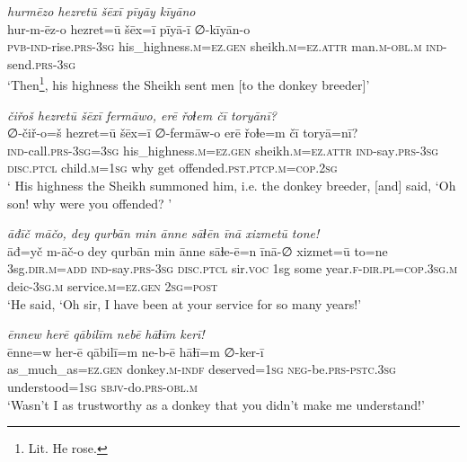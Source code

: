 \ea \label{HB.78}
\textit{hurmēzo hezretū šēxī pīyāy kīyāno} \\ 
\gll hur-m-ēz-o hezret=ū šēx=ī pīyā-ī ∅-kīyān-o \\ 
 \textsc{pvb-}\textsc{ind-}rise\textsc{.prs}\textsc{-3sg} his\_highness\textsc{.m}\textsc{=ez}\textsc{.gen} sheikh\textsc{.m}\textsc{=ez}.\textsc{attr} man\textsc{.m}\textsc{-obl}\textsc{.m} \textsc{ind-}send\textsc{.prs}\textsc{-3sg} \\ 
\glt `Then\footnote{Lit. He rose.}, his highness the Sheikh sent men [to the donkey breeder]'
\z 
 
\ea \label{HB.80}
\textit{čiřoš hezretū šēxī fermāwo, erē řoɫem čī toryānī?} \\ 
\gll ∅-čiř-o=š hezret=ū šēx=ī ∅-fermāw-o erē řoɫe=m čī toryā=nī? \\ 
 \textsc{ind-}call\textsc{.prs}\textsc{-3sg}\textsc{=3sg} his\_highness\textsc{.m}\textsc{=ez}\textsc{.gen} sheikh\textsc{.m}\textsc{=ez}.\textsc{attr} \textsc{ind-}say\textsc{.prs}\textsc{-3sg} \textsc{disc.ptcl} child\textsc{.m}\textsc{=1sg} why get offended\textsc{.pst}\textsc{.ptcp}\textsc{.m}\textsc{=cop}\textsc{.\textsc{2sg}} \\ 
\glt ` His highness the Sheikh summoned him, i.e. the donkey breeder, [and] said, ‘Oh son! why were you offended? '
\z 
 
\ea \label{HB.82}
\textit{āđīč māčo, dey qurbān min ānne sāɫēn īnā xizmetū tone!} \\ 
\gll āđ=yč m-āč-o dey qurbān min ānne sāɫe-ē=n īnā-∅ xizmet=ū to=ne \\ 
 3sg\textsc{.dir}\textsc{.m}\textsc{=add} \textsc{ind-}say\textsc{.prs}\textsc{-3sg} \textsc{disc.ptcl} sir.\textsc{voc} 1sg some year\textsc{\textsc{.f}}\textsc{-dir}\textsc{.pl}\textsc{=cop}\textsc{.3sg}\textsc{.m} deic\textsc{-3sg}\textsc{.m} service\textsc{.m}\textsc{=ez}\textsc{.gen} \textsc{2sg}\textsc{=\textsc{post}} \\ 
\glt `He said, ‘Oh sir, I have been at your service for so many years!'
\z 
 
\ea \label{HB.83}
\textit{ēnnew herē qābilīm nebē hāɫīm kerī!} \\ 
\gll ēnne=w her-ē qābilī=m ne-b-ē hāɫī=m ∅-ker-ī \\ 
 as\_much\_as\textsc{=ez}\textsc{.gen} donkey\textsc{.m}\textsc{-indf} deserved\textsc{=1sg} \textsc{neg-}be\textsc{.prs}\textsc{-pstc}\textsc{.3sg} understood\textsc{=1sg} \textsc{sbjv-}do\textsc{.prs}\textsc{-obl}\textsc{.m} \\ 
\glt `Wasn’t I as trustworthy as a donkey that you didn’t make me understand!'
\z 
 
